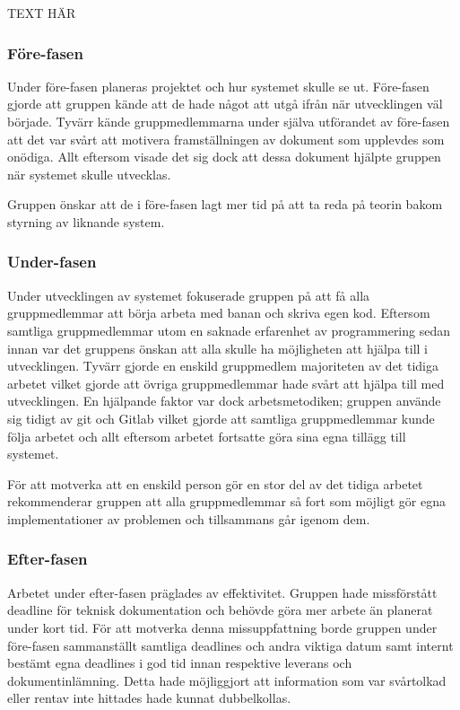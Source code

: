 \documentclass[10pt,oneside,swedish]{lips}
\begin{document}
TEXT HÄR

\subsubsection{Före-fasen}

Under före-fasen planeras projektet och hur systemet skulle se ut. Före-fasen
gjorde att gruppen kände att de hade något att utgå ifrån när utvecklingen väl
började. Tyvärr kände gruppmedlemmarna under själva utförandet av före-fasen att
det var svårt att motivera framställningen av dokument som upplevdes som
onödiga. Allt eftersom visade det sig dock att dessa dokument hjälpte gruppen
när systemet skulle utvecklas.

Gruppen önskar att de i före-fasen lagt mer tid på att ta reda på teorin bakom
styrning av liknande system.

\subsubsection{Under-fasen}

Under utvecklingen av systemet fokuserade gruppen på att få alla gruppmedlemmar
att börja arbeta med banan och skriva egen kod. Eftersom samtliga gruppmedlemmar
utom en saknade erfarenhet av programmering sedan innan var det gruppens önskan
att alla skulle ha möjligheten att hjälpa till i utvecklingen. Tyvärr gjorde en
enskild gruppmedlem majoriteten av det tidiga arbetet vilket gjorde att övriga
gruppmedlemmar hade svårt att hjälpa till med utvecklingen. En hjälpande faktor
var dock arbetsmetodiken; gruppen använde sig tidigt av git och Gitlab vilket
gjorde att samtliga gruppmedlemmar kunde följa arbetet och allt eftersom arbetet
fortsatte göra sina egna tillägg till systemet.

För att motverka att en enskild person gör en stor del av det tidiga
arbetet rekommenderar gruppen att alla gruppmedlemmar så fort som möjligt gör
egna implementationer av problemen och tillsammans går igenom dem.

\subsubsection{Efter-fasen}

Arbetet under efter-fasen präglades av effektivitet. Gruppen hade missförstått
deadline för teknisk dokumentation och behövde göra mer arbete än planerat under
kort tid. För att motverka denna missuppfattning borde gruppen under
före-fasen sammanställt samtliga deadlines och andra viktiga datum samt internt
bestämt egna deadlines i god tid innan respektive leverans och dokumentinlämning.
Detta hade möjliggjort att information som var svårtolkad eller rentav inte
hittades hade kunnat dubbelkollas.
\end{document}
